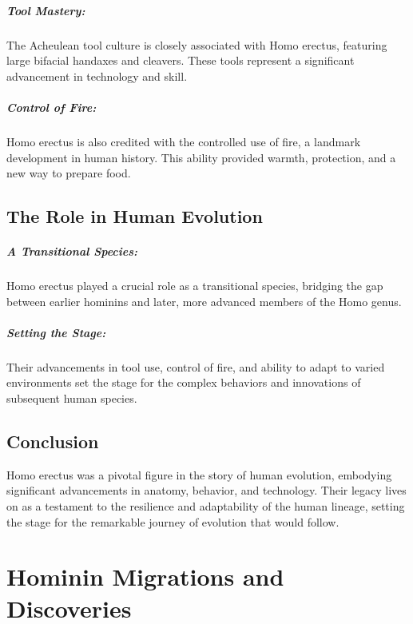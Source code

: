 \documentclass{book}
\begin{document}
\paragraph{Tool Mastery:}
The Acheulean tool culture is closely associated with Homo erectus, featuring large bifacial handaxes and cleavers. These tools represent a significant advancement in technology and skill.

\paragraph{Control of Fire:}
Homo erectus is also credited with the controlled use of fire, a landmark development in human history. This ability provided warmth, protection, and a new way to prepare food.

\section*{The Role in Human Evolution}

\paragraph{A Transitional Species:}
Homo erectus played a crucial role as a transitional species, bridging the gap between earlier hominins and later, more advanced members of the Homo genus.

\paragraph{Setting the Stage:}
Their advancements in tool use, control of fire, and ability to adapt to varied environments set the stage for the complex behaviors and innovations of subsequent human species.

\section*{Conclusion}

Homo erectus was a pivotal figure in the story of human evolution, embodying significant advancements in anatomy, behavior, and technology. Their legacy lives on as a testament to the resilience and adaptability of the human lineage, setting the stage for the remarkable journey of evolution that would follow.

\chapter{Hominin Migrations and Discoveries}
\end{document}

